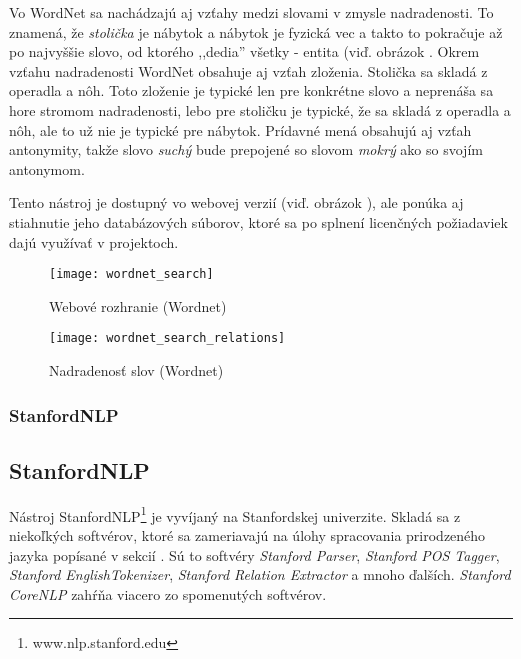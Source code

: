 Vo WordNet sa nachádzajú aj vzťahy medzi slovami v zmysle nadradenosti. To znamená, že \textit{stolička} je nábytok a nábytok je fyzická vec a takto to pokračuje až po najvyššie slovo, od ktorého ,,dedia'' všetky - entita (viď. obrázok . Okrem vzťahu nadradenosti WordNet obsahuje aj vzťah zloženia. Stolička sa skladá z operadla a nôh. Toto zloženie je typické len pre konkrétne slovo a neprenáša sa hore stromom nadradenosti,   lebo pre stoličku je typické, že sa skladá z operadla a nôh, ale to už nie je typické pre nábytok.
Prídavné mená obsahujú aj vzťah antonymity, takže slovo \textit{suchý} bude prepojené so slovom \textit{mokrý} ako so svojím antonymom.

Tento nástroj je dostupný vo webovej verzií (viď. obrázok ), ale ponúka aj stiahnutie jeho databázových súborov, ktoré sa po splnení licenčných požiadaviek dajú využívať v projektoch.

\begin{figure}[H]
\begin{center}\texttt{[image: wordnet\_search]}\end{center}
\caption[Webové rozhranie]{Webové rozhranie (Wordnet)}\label{fig:wordnet_search}
\end{figure}

\begin{figure}[H]
\begin{center}\texttt{[image: wordnet\_search\_relations]}\end{center}
\caption[Nadradenosť slov]{Nadradenosť slov (Wordnet)}\label{fig:wordnet_relations}
\end{figure}

%
%
{
	\subsubsection{StanfordNLP}
}
{
	\subsection{StanfordNLP}
}
\label{subsubsec:stanfordnlp}
Nástroj StanfordNLP\footnote{www.nlp.stanford.edu} je vyvíjaný na Stanfordskej univerzite. Skladá sa z niekoľkých softvérov, ktoré sa zameriavajú na úlohy spracovania prirodzeného jazyka popísané v sekcií . Sú to softvéry \textit{Stanford Parser}, \textit{Stanford POS Tagger}, \textit{Stanford EnglishTokenizer}, \textit{Stanford Relation Extractor} a mnoho ďalších. \textit{Stanford CoreNLP} zahŕňa viacero zo spomenutých softvérov.

